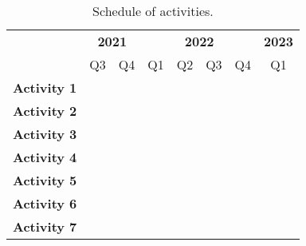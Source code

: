 \begin{table}[tb]
\centering
\caption{Schedule of activities.}
\label{tab:schedule}
\begin{tabular}{c|c|l|c|l|l|l|c|}
\cline{2-8}
 & \multicolumn{2}{c|}{\textbf{2021}} & \multicolumn{4}{c|}{\textbf{2022}} & \textbf{2023} \\ \cline{2-8} 
 & Q3 & \multicolumn{1}{c|}{Q4} & Q1 & \multicolumn{1}{c|}{Q2} & \multicolumn{1}{c|}{Q3} & \multicolumn{1}{c|}{Q4} & Q1 \\ \hline
\multicolumn{1}{|c|}{\textbf{Activity 1}} & \multicolumn{1}{l|}{} & \cellcolor[HTML]{333333} & \multicolumn{1}{l|}{\cellcolor[HTML]{333333}} & \cellcolor[HTML]{333333} & \cellcolor[HTML]{333333} & \cellcolor[HTML]{333333} & \multicolumn{1}{l|}{\cellcolor[HTML]{333333}} \\ \hline
\multicolumn{1}{|c|}{\textbf{Activity 2}} & \cellcolor[HTML]{333333} & \multicolumn{1}{c|}{\cellcolor[HTML]{333333}} &  & \multicolumn{1}{c|}{} & \multicolumn{1}{c|}{} & \multicolumn{1}{c|}{} &  \\ \hline
\multicolumn{1}{|c|}{\textbf{Activity 3}} &  & \multicolumn{1}{c|}{\cellcolor[HTML]{333333}} &  & \multicolumn{1}{c|}{} & \multicolumn{1}{c|}{} & \multicolumn{1}{c|}{} &  \\ \hline
\multicolumn{1}{|c|}{\textbf{Activity 4}} & \multicolumn{1}{l|}{} &  & \multicolumn{1}{l|}{\cellcolor[HTML]{333333}{\color[HTML]{333333} }} &  &  &  & \multicolumn{1}{l|}{} \\ \hline
\multicolumn{1}{|c|}{\textbf{Activity 5}} & \multicolumn{1}{l|}{} &  & \multicolumn{1}{l|}{\cellcolor[HTML]{333333}} & \cellcolor[HTML]{333333} & \cellcolor[HTML]{333333} & \cellcolor[HTML]{333333} & \multicolumn{1}{l|}{} \\ \hline
\multicolumn{1}{|c|}{\textbf{Activity 6}} & \multicolumn{1}{l|}{\cellcolor[HTML]{333333}} & \cellcolor[HTML]{333333} & \multicolumn{1}{l|}{\cellcolor[HTML]{333333}} & \cellcolor[HTML]{333333} & \cellcolor[HTML]{333333} & \cellcolor[HTML]{333333} & \multicolumn{1}{l|}{\cellcolor[HTML]{333333}} \\ \hline
\multicolumn{1}{|c|}{\textbf{Activity 7}} &  & \multicolumn{1}{c|}{} &  & \multicolumn{1}{c|}{} & \multicolumn{1}{c|}{} & \multicolumn{1}{c|}{\cellcolor[HTML]{333333}} & \cellcolor[HTML]{333333} \\ \hline
\end{tabular}
\end{table}